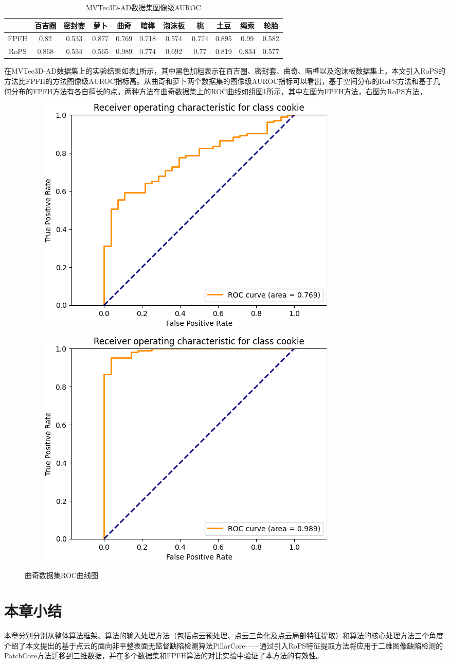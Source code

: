 \begin{table}[htbp]
    \centering
    \caption{MVTec3D-AD数据集图像级AUROC} \label{tab:mvtec3d-experiment}
    \begin{tabular*}{1\textwidth}{@{\extracolsep{\fill}}ccccccccccc}
    \toprule
      &百吉圈&密封套&萝卜&曲奇&暗榫&泡沫板&桃&土豆&绳索&轮胎\\
      \midrule
        FPFH&0.82&0.533&0.877&0.769&0.718&0.574&0.774&0.895&0.99&0.582\\
        RoPS&$\mathbf{0.868}$&$\mathbf{0.534}$&0.565&$\mathbf{0.989}$&$\mathbf{0.774}$&$\mathbf{0.692}$&0.77&0.819&0.834&0.577\\
    \bottomrule
    \end{tabular*}
\end{table}

在MVTec3D-AD数据集上的实验结果如表\ref{tab:mvtec3d-experiment}所示，其中黑色加粗表示在百吉圈、密封套、曲奇、暗榫以及泡沫板数据集上，本文引入RoPS的方法比FPFH的方法图像级AUROC指标高。从曲奇和萝卜两个数据集的图像级AUROC指标可以看出，基于空间分布的RoPS方法和基于几何分布的FPFH方法有各自擅长的点。两种方法在曲奇数据集上的ROC曲线如组图\ref{fig:cookie}所示，其中左图为FPFH方法，右图为RoPS方法。

\begin{figure}[htbp]
    \centering
    \begin{subfigure}
        \centering
        \includegraphics[width=.42\linewidth]{figures/3/cookie_FPFH.png}  
      \end{subfigure}
      \begin{subfigure}
        \centering
        \includegraphics[width=.42\linewidth]{figures/3/cookie_RoPS.png} 
      \end{subfigure}
    \caption{曲奇数据集ROC曲线图}
    \label{fig:cookie}
  \end{figure}

\section{本章小结}
本章分别分别从整体算法框架、算法的输入处理方法（包括点云预处理、点云三角化及点云局部特征提取）和算法的核心处理方法三个角度介绍了本文提出的基于点云的面向非平整表面无监督缺陷检测算法PillarCore——通过引入RoPS特征提取方法将应用于二维图像缺陷检测的PatchCore方法迁移到三维数据，并在多个数据集和FPFH算法的对比实验中验证了本方法的有效性。

